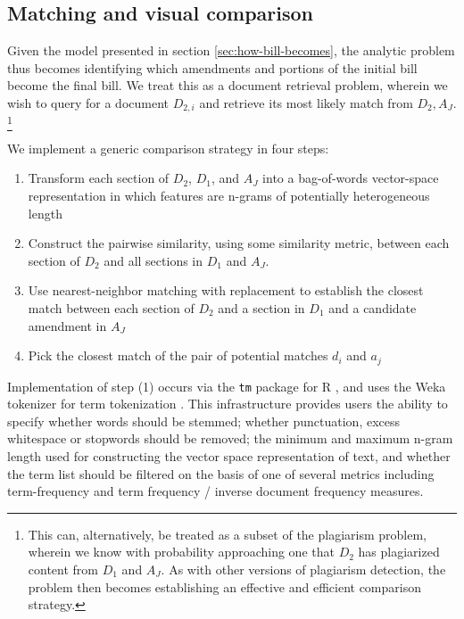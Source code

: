 \documentclass[11pt]{article}
\begin{document}
\subsection{Matching and visual comparison}
\label{sec:match-visu-comp}

Given the model presented in section \ref{sec:how-bill-becomes}, the
analytic problem thus becomes identifying which amendments and
portions of the initial bill become the final bill. We treat this as a
document retrieval problem, wherein we wish to query for a document
$D_{2,i}$ and retrieve its most likely match from $D_2,
A_J$. \footnote{This can, alternatively, be treated as a
subset of the plagiarism problem, wherein we know with probability
approaching one that $D_2$ has plagiarized content from $D_1$ and
$A_J$. As with other versions of plagiarism detection, the problem
then becomes establishing an effective and efficient comparison
strategy.}

We implement a generic comparison strategy in four steps:
\begin{enumerate}
\item Transform each section of $D_2$, $D_1$, and $A_J$ into a
  bag-of-words vector-space representation in which features are
  n-grams of potentially heterogeneous length
\item Construct the pairwise similarity, using some similarity metric,
  between each section of $D_2$ and all sections in $D_1$ and $A_J$.
\item Use nearest-neighbor matching with replacement to establish
  the closest match between each section of $D_2$ and a section in
  $D_1$ and a candidate amendment in $A_J$
\item Pick the closest match of the pair of potential matches $d_i$
  and $a_j$
\end{enumerate}

Implementation of step (1) occurs via the \texttt{tm} package for R \citep{meyer2008text},
and uses the Weka tokenizer for term
tokenization \citep{hall2009weka}. This infrastructure provides users the ability to
specify whether words should be stemmed; whether punctuation, excess
whitespace or stopwords should be
removed; the minimum and maximum n-gram length used for constructing the vector space
representation of text, and whether the term list should be filtered
on the basis of one of several metrics including term-frequency and
term frequency / inverse document frequency measures. 
\end{document}
